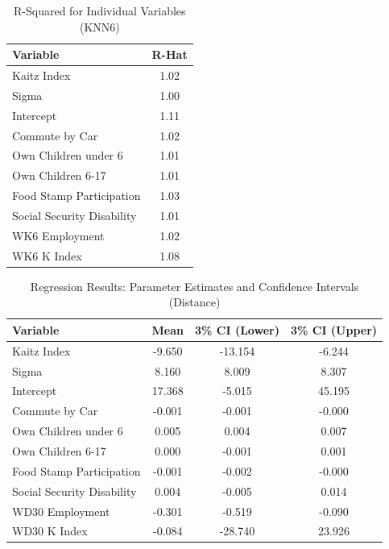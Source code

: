 \documentclass[12pt]{article}
\begin{document}
\begin{table}[H]
	\centering
	\begin{tabular}{lc}
		\toprule
		\textbf{Variable}          & \textbf{R-Hat} \\
		\midrule
		Kaitz Index                & 1.02           \\
		Sigma                      & 1.00           \\
		Intercept                  & 1.11           \\
		Commute by Car             & 1.02           \\
		Own Children under 6       & 1.01           \\
		Own Children 6-17          & 1.01           \\
		Food Stamp Participation   & 1.03           \\
		Social Security Disability & 1.01           \\
		WK6 Employment             & 1.02           \\
		WK6 K Index                & 1.08           \\
		\bottomrule
	\end{tabular}
	\caption{R-Squared for Individual Variables (KNN6)}
\end{table}


\begin{table}[H]
	\centering
	\begin{tabular}{lccc}
		\toprule
		\textbf{Variable}          & \textbf{Mean} & \textbf{3\% CI (Lower)} & \textbf{3\% CI (Upper)} \\
		\midrule
		Kaitz Index                & -9.650        & -13.154                 & -6.244                  \\
		Sigma                      & 8.160         & 8.009                   & 8.307                   \\
		Intercept                  & 17.368        & -5.015                  & 45.195                  \\
		Commute by Car             & -0.001        & -0.001                  & -0.000                  \\
		Own Children under 6       & 0.005         & 0.004                   & 0.007                   \\
		Own Children 6-17          & 0.000         & -0.001                  & 0.001                   \\
		Food Stamp Participation   & -0.001        & -0.002                  & -0.000                  \\
		Social Security Disability & 0.004         & -0.005                  & 0.014                   \\
		WD30 Employment            & -0.301        & -0.519                  & -0.090                  \\
		WD30 K Index               & -0.084        & -28.740                 & 23.926                  \\
		\bottomrule
	\end{tabular}
	\caption{Regression Results: Parameter Estimates and Confidence Intervals (Distance)}
\end{table}
\end{document}
